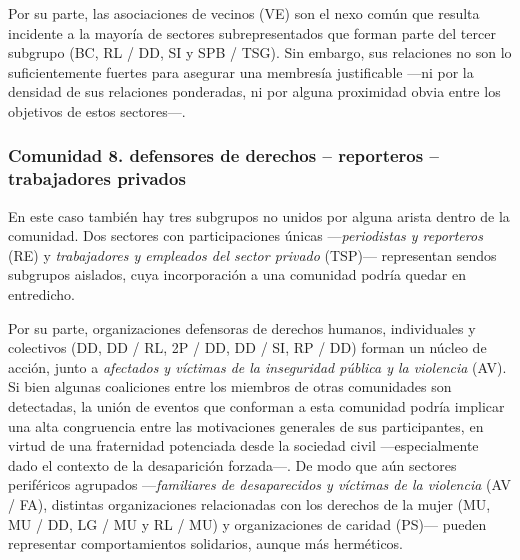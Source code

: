 \documentclass[letterpaper, 11pt]{book}
\theoremstyle{definition}
\theoremstyle{remark}
\begin{document}
Por su parte, las asociaciones de vecinos (VE) son el nexo común que resulta incidente a la mayoría de sectores subrepresentados que forman parte del tercer subgrupo (BC, RL / DD, SI y SPB / TSG). 
Sin embargo, sus relaciones no son lo suficientemente fuertes para asegurar una membresía justificable ---ni por la densidad de sus relaciones ponderadas, ni por alguna proximidad obvia entre los objetivos de estos sectores---. 




\subsubsection{Comunidad 8. defensores de derechos -- reporteros -- trabajadores privados}
\label{subsubsec:comunidad8}

En este caso también hay tres subgrupos no unidos por alguna arista dentro de la comunidad. 
Dos sectores con participaciones únicas ---\emph{periodistas y reporteros} (RE) y \emph{trabajadores y empleados del sector privado} (TSP)--- representan sendos subgrupos aislados, cuya incorporación a una comunidad podría quedar en entredicho. 


Por su parte, organizaciones defensoras de derechos humanos, individuales y colectivos (DD, DD / RL, 2P / DD, DD / SI, RP / DD) forman un núcleo de acción, junto a \emph{afectados y víctimas de la inseguridad pública y la violencia} (AV). 
Si bien algunas coaliciones entre los miembros de otras comunidades son detectadas, la unión de eventos que conforman a esta comunidad podría implicar una alta congruencia entre las motivaciones generales de sus participantes, en virtud de una fraternidad potenciada desde la sociedad civil ---especialmente dado el contexto de la desaparición forzada---. 
De modo que aún sectores periféricos agrupados ---\emph{familiares de desaparecidos y víctimas de la violencia} (AV / FA), distintas organizaciones relacionadas con los derechos de la mujer (MU, MU / DD, LG / MU y RL / MU) y organizaciones de caridad (PS)--- pueden representar comportamientos solidarios, aunque más herméticos. 





\end{document}
